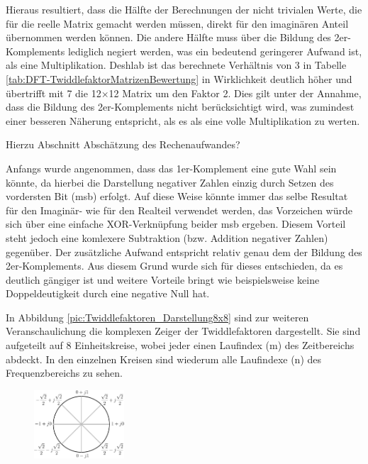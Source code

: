  
 
 Hieraus resultiert, dass die Hälfte der Berechnungen der nicht trivialen Werte, die für die reelle Matrix gemacht werden müssen,
 direkt für den imaginären Anteil übernommen werden können. Die andere Hälfte muss über die Bildung des 2er-Komplements lediglich negiert werden, was ein 
 bedeutend geringerer Aufwand ist, als eine Multiplikation. 
 Deshlab ist das berechnete Verhältnis von 3 in Tabelle \ref{tab:DFT-TwiddlefaktorMatrizenBewertung} in Wirklichkeit deutlich höher und übertrifft mit 7 die 12$\times$12
 Matrix um den Faktor 2. Dies gilt unter der Annahme, dass die Bildung des 2er-Komplements nicht berücksichtigt wird, was zumindest einer besseren Näherung 
 entspricht, als es als eine volle Multiplikation zu werten.
 
 Hierzu Abschnitt Abschätzung des Rechenaufwandes?
 
 Anfangs wurde angenommen, dass das 1er-Komplement eine gute Wahl sein könnte, da hierbei die Darstellung negativer Zahlen einzig durch Setzen des vordersten 
 Bit (\gls{msb}) erfolgt. Auf diese Weise könnte immer das selbe Resultat für den Imaginär- wie für den Realteil verwendet werden, das Vorzeichen würde sich über eine 
 einfache XOR-Verknüpfung beider \gls{msb} ergeben.
 Diesem Vorteil steht jedoch eine komlexere Subtraktion (bzw. Addition negativer Zahlen) gegenüber. Der zusätzliche Aufwand entspricht 
 relativ genau dem der Bildung des 2er-Komplements. Aus diesem Grund wurde sich für dieses entschieden, da es deutlich gängiger ist und weitere Vorteile bringt wie 
 beispielsweise keine Doppeldeutigkeit durch eine negative Null hat.
 
 In Abbildung \ref{pic:Twiddlefaktoren_Darstellung8x8} sind zur weiteren Veranschaulichung die komplexen Zeiger der Twiddlefaktoren dargestellt. Sie sind aufgeteilt auf 8 
 Einheitskreise, wobei jeder einen Laufindex (m) des Zeitbereichs abdeckt. In den einzelnen Kreisen sind wiederum alle Laufindexe (n) des Frequenzbereichs zu sehen.
 

 \begin{figure}[!t]
  \centering
  \includegraphics[width=0.3\textwidth]{img/Einheitskreis-crop.pdf}
  \label{pic:Einheitskreis_Faktoren}
\end{figure}
  
